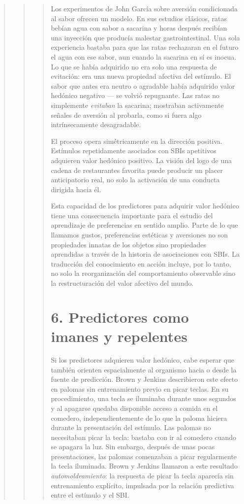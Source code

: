 \documentclass[
  letterpaper,
  DIV=11,
  numbers=noendperiod]{scrreprt}
\begin{document}
\begin{tcolorbox}[enhanced jigsaw, arc=.35mm, bottomrule=.15mm, breakable, colback=white, colframe=quarto-callout-note-color-frame, left=2mm, leftrule=.75mm, opacityback=0, rightrule=.15mm, toprule=.15mm]
\begin{quote}
\begin{quote}
\begin{quote}
Los experimentos de John García sobre aversión condicionada al sabor
ofrecen un modelo. En sus estudios clásicos, ratas bebían agua con sabor
a sacarina y horas después recibían una inyección que producía malestar
gastrointestinal. Una sola experiencia bastaba para que las ratas
rechazaran en el futuro el agua con ese sabor, aun cuando la sacarina en
sí es inocua. Lo que se había adquirido no era solo una respuesta de
evitación: era una nueva propiedad afectiva del estímulo. El sabor que
antes era neutro o agradable había adquirido valor hedónico negativo ---
se volvió repugnante. Las ratas no simplemente \emph{evitaban} la
sacarina; mostraban activamente señales de aversión al probarla, como si
fuera algo intrínsecamente desagradable.

El proceso opera simétricamente en la dirección positiva. Estímulos
repetidamente asociados con SBIs apetitivos adquieren valor hedónico
positivo. La visión del logo de una cadena de restaurantes favorita
puede producir un placer anticipatorio real, no solo la activación de
una conducta dirigida hacia él.

Esta capacidad de los predictores para adquirir valor hedónico tiene una
consecuencia importante para el estudio del aprendizaje de preferencias
en sentido amplio. Parte de lo que llamamos gustos, preferencias
estéticas y aversiones no son propiedades innatas de los objetos sino
propiedades aprendidas a través de la historia de asociaciones con SBIs.
La traducción del conocimiento en acción incluye, por lo tanto, no solo
la reorganización del comportamiento observable sino la restructuración
del valor afectivo del mundo.

\mbox{}%
\section{6. Predictores como imanes y
repelentes}\label{predictores-como-imanes-y-repelentes}

Si los predictores adquieren valor hedónico, cabe esperar que también
orienten espacialmente al organismo hacia o desde la fuente de
predicción. Brown y Jenkins describieron este efecto en palomas sin
entrenamiento previo en picar teclas. En su procedimiento, una tecla se
iluminaba durante unos segundos y al apagarse quedaba disponible acceso
a comida en el comedero, independientemente de lo que la paloma hiciera
durante la presentación del estímulo. Las palomas no necesitaban picar
la tecla: bastaba con ir al comedero cuando se apagara la luz. Sin
embargo, después de unas pocas presentaciones, las palomas comenzaban a
picar regularmente la tecla iluminada. Brown y Jenkins llamaron a este
resultado \emph{automoldeamiento}: la respuesta de picar la tecla
aparecía sin entrenamiento explícito, impulsada por la relación
predictiva entre el estímulo y el SBI.


\end{quote}
\end{quote}
\end{quote}
\end{tcolorbox}
\end{document}
